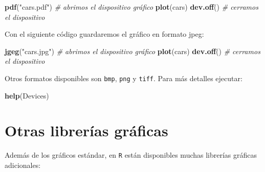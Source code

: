 \documentclass[]{book}
\newenvironment{Shaded}{\begin{snugshade}}{\end{snugshade}}
\newcommand{\CommentTok}[1]{\textcolor[rgb]{0.56,0.35,0.01}{\textit{#1}}}
\newcommand{\KeywordTok}[1]{\textcolor[rgb]{0.13,0.29,0.53}{\textbf{#1}}}
\newcommand{\NormalTok}[1]{#1}
\newcommand{\StringTok}[1]{\textcolor[rgb]{0.31,0.60,0.02}{#1}}
\begin{document}
\begin{Shaded}
\begin{Highlighting}[]
\KeywordTok{pdf}\NormalTok{(}\StringTok{"cars.pdf"}\NormalTok{)   }\CommentTok{# abrimos el dispositivo gráfico}
\KeywordTok{plot}\NormalTok{(cars)}
\KeywordTok{dev.off}\NormalTok{()         }\CommentTok{# cerramos el dispositivo}
\end{Highlighting}
\end{Shaded}

Con el siguiente código guardaremos el gráfico en formato jpeg:

\begin{Shaded}
\begin{Highlighting}[]
\KeywordTok{jgeg}\NormalTok{(}\StringTok{"cars.jpg"}\NormalTok{)  }\CommentTok{# abrimos el dispositivo gráfico}
\KeywordTok{plot}\NormalTok{(cars)}
\KeywordTok{dev.off}\NormalTok{()         }\CommentTok{# cerramos el dispositivo}
\end{Highlighting}
\end{Shaded}

Otros formatos disponibles son \texttt{bmp}, \texttt{png} y \texttt{tiff}. Para más detalles ejecutar:

\begin{Shaded}
\begin{Highlighting}[]
\KeywordTok{help}\NormalTok{(Devices)}
\end{Highlighting}
\end{Shaded}

\hypertarget{otras-librerias-graficas}{%
\section{Otras librerías gráficas}\label{otras-librerias-graficas}}

Además de los gráficos estándar, en \texttt{R} están disponibles muchas librerías gráficas adicionales:
\end{document}
